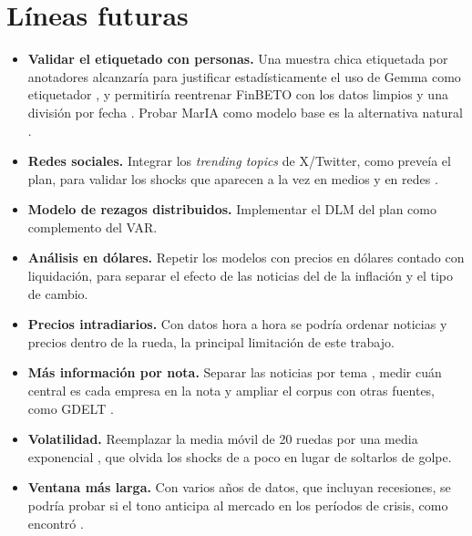 \section{Líneas futuras}
\label{sec:futuro}

\begin{itemize}
  \item \textbf{Validar el etiquetado con personas.} Una muestra chica etiquetada por
        anotadores alcanzaría para justificar estadísticamente el uso de Gemma como
        etiquetador \citep{calderon2025alttest}, y permitiría reentrenar FinBETO con los datos
        limpios y una división por fecha \citep{xue2026temporal}. Probar MarIA como modelo base
        es la alternativa natural \citep{gutierrez2022maria,pan2023peerj}.
  \item \textbf{Redes sociales.} Integrar los \textit{trending topics} de X/Twitter, como
        preveía el plan, para validar los shocks que aparecen a la vez en medios y en redes
        \citep{yang2024,wu2026}.
  \item \textbf{Modelo de rezagos distribuidos.} Implementar el DLM del plan como
        complemento del VAR.
  \item \textbf{Análisis en dólares.} Repetir los modelos con precios en dólares contado con
        liquidación, para separar el efecto de las noticias del de la inflación y el tipo de
        cambio.
  \item \textbf{Precios intradiarios.} Con datos hora a hora se podría ordenar noticias y
        precios dentro de la rueda, la principal limitación de este trabajo.
  \item \textbf{Más información por nota.} Separar las noticias por tema \citep{chen2025topics},
        medir cuán central es cada empresa en la nota \citep{asgarieh2024salient} y ampliar el
        corpus con otras fuentes, como GDELT \citep{fronzetti2026gdelt}.
  \item \textbf{Volatilidad.} Reemplazar la media móvil de 20 ruedas por una media exponencial
        \citep{riskmetrics1996}, que olvida los shocks de a poco en lugar de soltarlos de golpe.
  \item \textbf{Ventana más larga.} Con varios años de datos, que incluyan recesiones, se podría
        probar si el tono anticipa al mercado en los períodos de crisis, como encontró
        \citet{garcia2013}.
\end{itemize}
